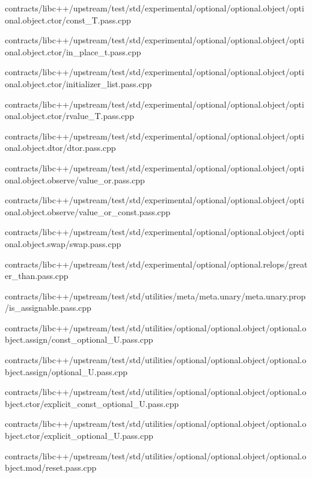 \begin{DoxyCompactItemize}
contracts/libc++/upstream/test/std/experimental/optional/optional.\+object/optional.\+object.\+ctor/const\+\_\+\+T.\+pass.\+cpp\item 
contracts/libc++/upstream/test/std/experimental/optional/optional.\+object/optional.\+object.\+ctor/in\+\_\+place\+\_\+t.\+pass.\+cpp\item 
contracts/libc++/upstream/test/std/experimental/optional/optional.\+object/optional.\+object.\+ctor/initializer\+\_\+list.\+pass.\+cpp\item 
contracts/libc++/upstream/test/std/experimental/optional/optional.\+object/optional.\+object.\+ctor/rvalue\+\_\+\+T.\+pass.\+cpp\item 
contracts/libc++/upstream/test/std/experimental/optional/optional.\+object/optional.\+object.\+dtor/dtor.\+pass.\+cpp\item 
contracts/libc++/upstream/test/std/experimental/optional/optional.\+object/optional.\+object.\+observe/value\+\_\+or.\+pass.\+cpp\item 
contracts/libc++/upstream/test/std/experimental/optional/optional.\+object/optional.\+object.\+observe/value\+\_\+or\+\_\+const.\+pass.\+cpp\item 
contracts/libc++/upstream/test/std/experimental/optional/optional.\+object/optional.\+object.\+swap/swap.\+pass.\+cpp\item 
contracts/libc++/upstream/test/std/experimental/optional/optional.\+relops/greater\+\_\+than.\+pass.\+cpp\item 
contracts/libc++/upstream/test/std/utilities/meta/meta.\+unary/meta.\+unary.\+prop/is\+\_\+assignable.\+pass.\+cpp\item 
contracts/libc++/upstream/test/std/utilities/optional/optional.\+object/optional.\+object.\+assign/const\+\_\+optional\+\_\+\+U.\+pass.\+cpp\item 
contracts/libc++/upstream/test/std/utilities/optional/optional.\+object/optional.\+object.\+assign/optional\+\_\+\+U.\+pass.\+cpp\item 
contracts/libc++/upstream/test/std/utilities/optional/optional.\+object/optional.\+object.\+ctor/explicit\+\_\+const\+\_\+optional\+\_\+\+U.\+pass.\+cpp\item 
contracts/libc++/upstream/test/std/utilities/optional/optional.\+object/optional.\+object.\+ctor/explicit\+\_\+optional\+\_\+\+U.\+pass.\+cpp\item 
contracts/libc++/upstream/test/std/utilities/optional/optional.\+object/optional.\+object.\+mod/reset.\+pass.\+cpp\item 

\end{DoxyCompactItemize}

